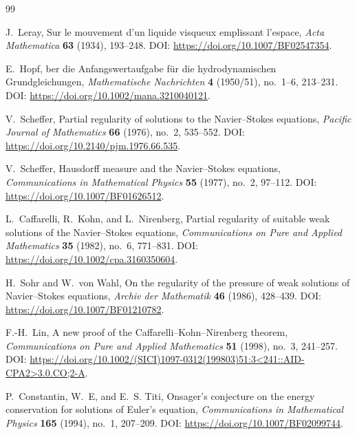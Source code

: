 \documentclass[11pt]{article}
\numberwithin{equation}{section}
\theoremstyle{definition}
\theoremstyle{remark}
\begin{document}
\begin{thebibliography}{99}

J.~Leray,
\newblock Sur le mouvement d'un liquide visqueux emplissant l'espace,
\newblock \emph{Acta Mathematica} \textbf{63} (1934), 193--248.
\newblock DOI: \url{https://doi.org/10.1007/BF02547354}.

E.~Hopf,
ber die Anfangswertaufgabe f{\"u}r die hydrodynamischen Grundgleichungen,
\newblock \emph{Mathematische Nachrichten} \textbf{4} (1950/51), no.~1--6, 213--231.
\newblock DOI: \url{https://doi.org/10.1002/mana.3210040121}.

V.~Scheffer,
\newblock Partial regularity of solutions to the Navier--Stokes equations,
\newblock \emph{Pacific Journal of Mathematics} \textbf{66} (1976), no.~2, 535--552.
\newblock DOI: \url{https://doi.org/10.2140/pjm.1976.66.535}.

V.~Scheffer,
\newblock Hausdorff measure and the Navier--Stokes equations,
\newblock \emph{Communications in Mathematical Physics} \textbf{55} (1977), no.~2, 97--112.
\newblock DOI: \url{https://doi.org/10.1007/BF01626512}.

L.~Caffarelli, R.~Kohn, and L.~Nirenberg,
\newblock Partial regularity of suitable weak solutions of the Navier--Stokes equations,
\newblock \emph{Communications on Pure and Applied Mathematics} \textbf{35} (1982), no.~6, 771--831.
\newblock DOI: \url{https://doi.org/10.1002/cpa.3160350604}.

H.~Sohr and W.~von Wahl,
\newblock On the regularity of the pressure of weak solutions of Navier--Stokes equations,
\newblock \emph{Archiv der Mathematik} \textbf{46} (1986), 428--439.
\newblock DOI: \url{https://doi.org/10.1007/BF01210782}.

F.-H.~Lin,
\newblock A new proof of the Caffarelli--Kohn--Nirenberg theorem,
\newblock \emph{Communications on Pure and Applied Mathematics} \textbf{51} (1998), no.~3, 241--257.
\newblock DOI: \url{https://doi.org/10.1002/(SICI)1097-0312(199803)51:3<241::AID-CPA2>3.0.CO;2-A}.

P.~Constantin, W.~E, and E.~S. Titi,
\newblock Onsager's conjecture on the energy conservation for solutions of Euler's equation,
\newblock \emph{Communications in Mathematical Physics} \textbf{165} (1994), no.~1, 207--209.
\newblock DOI: \url{https://doi.org/10.1007/BF02099744}.


\end{thebibliography}
\end{document}
